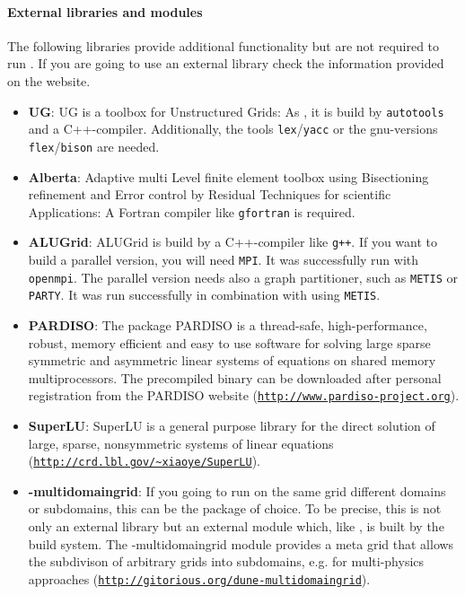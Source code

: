 \paragraph{External libraries and modules}

The following libraries provide additional functionality but are not required to run \Dumux. 
If you are going to use an external library check the information provided on the \Dune website.

\begin{itemize}
\item \textbf{UG}: UG is a toolbox for Unstructured Grids: As \Dumux, it is build by \texttt{autotools} and a C++-compiler. Additionally, the tools \texttt{lex}/\texttt{yacc} or the gnu-versions \texttt{flex}/\texttt{bison} are needed. 

\item \textbf{Alberta}: Adaptive multi Level finite element toolbox using Bisectioning refinement and Error control by Residual Techniques for scientific Applications: A Fortran compiler like \texttt{gfortran} is required.

\item \textbf{ALUGrid}: ALUGrid is build by a C++-compiler like \texttt{g++}. If you want to build a parallel version, you will need \texttt{MPI}. It was successfully run with \texttt{openmpi}. The parallel version needs also a graph partitioner, such as \texttt{METIS} or \texttt{PARTY}. It was run successfully in combination with \Dune using \texttt{METIS}.

\item \textbf{PARDISO}: The package PARDISO is a thread-safe, high-performance, robust, memory efficient and easy to use software for solving large sparse symmetric and asymmetric linear systems of equations on shared memory multiprocessors. The precompiled binary can be downloaded after personal registration from the PARDISO website (\texttt{\url{http://www.pardiso-project.org}}).

\item \textbf{SuperLU}: SuperLU is a general purpose library for the direct solution of large, sparse, nonsymmetric systems of linear equations (\texttt{\url{http://crd.lbl.gov/~xiaoye/SuperLU}}).

\item \textbf{\Dune-multidomaingrid}: If you going to run on the same grid different domains or subdomains, this can be the package of choice. 
To be precise, this is not only an external library but an external \Dune module which, like \Dumux, is built by the \Dune build system. The \Dune-multidomaingrid module provides a meta grid that allows the subdivison of arbitrary \Dune grids into subdomains, e.g. for multi-physics approaches (\texttt{\url{http://gitorious.org/dune-multidomaingrid}}).
\end{itemize}

